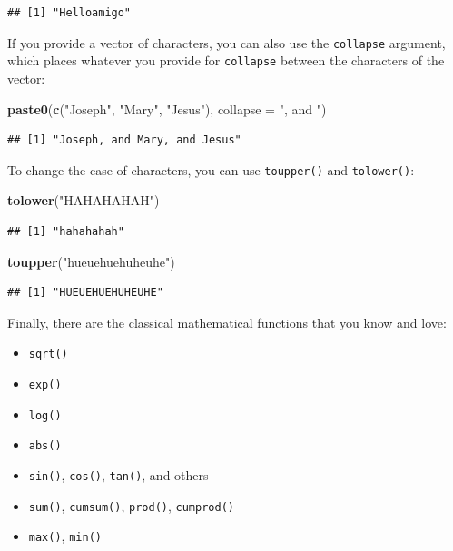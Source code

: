 \documentclass[]{gitbook}
\newenvironment{Shaded}{\begin{snugshade}}{\end{snugshade}}
\newcommand{\DataTypeTok}[1]{\textcolor[rgb]{0.13,0.29,0.53}{#1}}
\newcommand{\KeywordTok}[1]{\textcolor[rgb]{0.13,0.29,0.53}{\textbf{#1}}}
\newcommand{\NormalTok}[1]{#1}
\newcommand{\StringTok}[1]{\textcolor[rgb]{0.31,0.60,0.02}{#1}}
\providecommand{\tightlist}{%
  \setlength{\itemsep}{0pt}\setlength{\parskip}{0pt}}
\begin{document}
\begin{verbatim}
## [1] "Helloamigo"
\end{verbatim}

If you provide a vector of characters, you can also use the \texttt{collapse} argument, which places whatever you provide for \texttt{collapse} between the
characters of the vector:

\begin{Shaded}
\begin{Highlighting}[]
\KeywordTok{paste0}\NormalTok{(}\KeywordTok{c}\NormalTok{(}\StringTok{"Joseph"}\NormalTok{, }\StringTok{"Mary"}\NormalTok{, }\StringTok{"Jesus"}\NormalTok{), }\DataTypeTok{collapse =} \StringTok{", and "}\NormalTok{)}
\end{Highlighting}
\end{Shaded}

\begin{verbatim}
## [1] "Joseph, and Mary, and Jesus"
\end{verbatim}

To change the case of characters, you can use \texttt{toupper()} and \texttt{tolower()}:

\begin{Shaded}
\begin{Highlighting}[]
\KeywordTok{tolower}\NormalTok{(}\StringTok{"HAHAHAHAH"}\NormalTok{)}
\end{Highlighting}
\end{Shaded}

\begin{verbatim}
## [1] "hahahahah"
\end{verbatim}

\begin{Shaded}
\begin{Highlighting}[]
\KeywordTok{toupper}\NormalTok{(}\StringTok{"hueuehuehuheuhe"}\NormalTok{)}
\end{Highlighting}
\end{Shaded}

\begin{verbatim}
## [1] "HUEUEHUEHUHEUHE"
\end{verbatim}

Finally, there are the classical mathematical functions that you know and love:

\begin{itemize}
\tightlist
\item
  \texttt{sqrt()}
\item
  \texttt{exp()}
\item
  \texttt{log()}
\item
  \texttt{abs()}
\item
  \texttt{sin()}, \texttt{cos()}, \texttt{tan()}, and others
\item
  \texttt{sum()}, \texttt{cumsum()}, \texttt{prod()}, \texttt{cumprod()}
\item
  \texttt{max()}, \texttt{min()}
\end{itemize}
\end{document}
